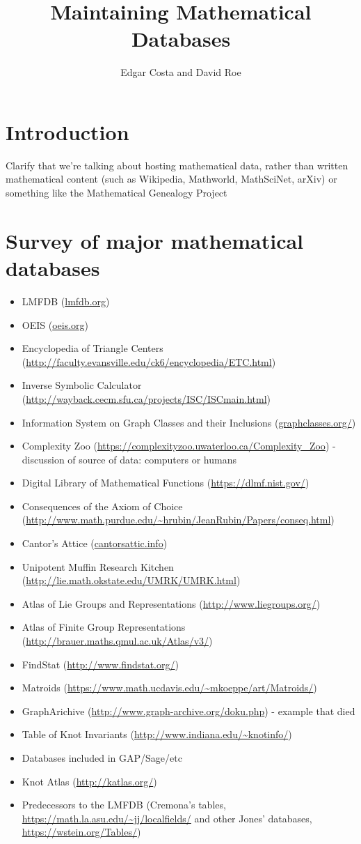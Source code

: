 \documentclass{article}
\title{Maintaining Mathematical Databases}
\author{Edgar Costa and David Roe}
\begin{document}
\maketitle

\section{Introduction}

Clarify that we're talking about hosting mathematical data, rather than written mathematical content (such as Wikipedia, Mathworld, MathSciNet, arXiv) or something like the Mathematical Genealogy Project

\section{Survey of major mathematical databases}

\begin{itemize}
\item LMFDB (\url{lmfdb.org})
\item OEIS (\url{oeis.org})
\item Encyclopedia of Triangle Centers (\url{http://faculty.evansville.edu/ck6/encyclopedia/ETC.html})
\item Inverse Symbolic Calculator (\url{http://wayback.cecm.sfu.ca/projects/ISC/ISCmain.html})
\item Information System on Graph Classes and their Inclusions (\url{graphclasses.org/})
\item Complexity Zoo (\url{https://complexityzoo.uwaterloo.ca/Complexity_Zoo}) - discussion of source of data: computers or humans
\item Digital Library of Mathematical Functions (\url{https://dlmf.nist.gov/})
\item Consequences of the Axiom of Choice (\url{http://www.math.purdue.edu/~hrubin/JeanRubin/Papers/conseq.html})
\item Cantor's Attice (\url{cantorsattic.info})
\item Unipotent Muffin Research Kitchen (\url{http://lie.math.okstate.edu/UMRK/UMRK.html})
\item Atlas of Lie Groups and Representations (\url{http://www.liegroups.org/})
\item Atlas of Finite Group Representations (\url{http://brauer.maths.qmul.ac.uk/Atlas/v3/})
\item FindStat (\url{http://www.findstat.org/})
\item Matroids (\url{https://www.math.ucdavis.edu/~mkoeppe/art/Matroids/})
\item GraphArichive (\url{http://www.graph-archive.org/doku.php}) - example that died
\item Table of Knot Invariants (\url{http://www.indiana.edu/~knotinfo/})
\item Databases included in GAP/Sage/etc
\item Knot Atlas (\url{http://katlas.org/})
\item Predecessors to the LMFDB (Cremona's tables, \url{https://math.la.asu.edu/~jj/localfields/} and other Jones' databases, \url{https://wstein.org/Tables/})
\end{itemize}
\end{document}
